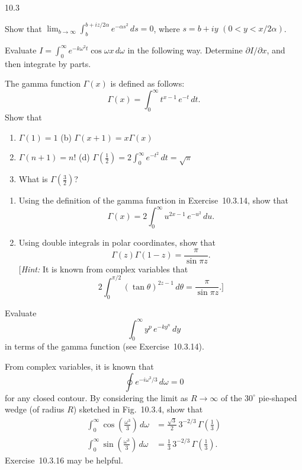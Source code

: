 \begin{exercises}{10.3}
\item Show that $\lim_{b\to\infty}\int_b^{b+iz/2\alpha} e^{-\alpha s^2}\,ds = 0$, where $s = b + iy$ $(0 < y < x/2\alpha)$.

\item Evaluate $I = \int_0^{\infty} e^{-k\omega^2 t}\cos\omega x\,d\omega$ in the following way.  Determine $\partial I/\partial x$, and then integrate by parts.

\item The gamma function $\Gamma(x)$ is defined as follows:
\[
\Gamma(x) = \int_0^{\infty} t^{x-1}\,e^{-t}\,dt.
\]
Show that
\begin{enumerate}
\item[(a)] $\Gamma(1) = 1$ \hfill (b) $\Gamma(x+1) = x\Gamma(x)$
\item[(c)] $\Gamma(n+1) = n!$ \hfill (d) $\Gamma(\tfrac{1}{2}) = 2\int_0^{\infty} e^{-t^2}\,dt = \sqrt{\pi}$
\item[(e)] What is $\Gamma(\tfrac{3}{2})$?
\end{enumerate}

\item
\begin{enumerate}
\item[(a)] Using the definition of the gamma function in Exercise~10.3.14, show that
\[
\Gamma(x) = 2\int_0^{\infty} u^{2x-1}\,e^{-u^2}\,du.
\]
\item[(b)] Using double integrals in polar coordinates, show that
\[
\Gamma(z)\Gamma(1-z) = \frac{\pi}{\sin\pi z}.
\]
[\textit{Hint:} It is known from complex variables that
\[
2\int_0^{\pi/2}(\tan\theta)^{2z-1}\,d\theta = \frac{\pi}{\sin\pi z}.\text{]}
\]
\end{enumerate}

\item[\starred 10.3.16.] Evaluate
\[
\int_0^{\infty} y^p\,e^{-ky^n}\,dy
\]
in terms of the gamma function (see Exercise~10.3.14).

\item From complex variables, it is known that
\[
\oint e^{-i\omega^3/3}\,d\omega = 0
\]
for any closed contour.  By considering the limit as $R \to \infty$ of the $30^\circ$ pie-shaped wedge (of radius $R$) sketched in Fig.~10.3.4, show that
\begin{align*}
\int_0^{\infty}\cos\left(\frac{\omega^3}{3}\right)\,d\omega &= \frac{\sqrt{3}}{2}\,3^{-2/3}\,\Gamma\!\left(\tfrac{1}{3}\right) \\
\int_0^{\infty}\sin\left(\frac{\omega^3}{3}\right)\,d\omega &= \tfrac{1}{3}\,3^{-2/3}\,\Gamma\!\left(\tfrac{1}{3}\right).
\end{align*}
Exercise~10.3.16 may be helpful.


\end{exercises}
